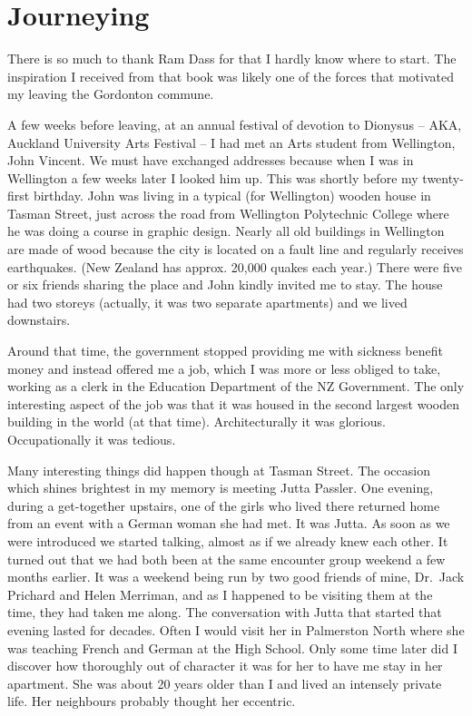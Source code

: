 \chapter{Journeying}

There is so much to thank Ram Dass for that I hardly know where to
start. The inspiration I received from that book was likely one of the
forces that motivated my leaving the Gordonton commune.

A few weeks before leaving, at an annual festival of devotion to
Dionysus -- AKA, Auckland University Arts Festival -- I had met an Arts
student from Wellington, John Vincent. We must have exchanged addresses
because when I was in Wellington a few weeks later I looked him up. This
was shortly before my twenty-first birthday. John was living in a typical (for
Wellington) wooden house in Tasman Street, just across the road from
Wellington Polytechnic College where he was doing a course in graphic
design. Nearly all old buildings in Wellington are made of wood because
the city is located on a fault line and regularly receives earthquakes.
(New Zealand has approx. 20,000 quakes\cite{quakes} each year.)
There were five or six friends sharing the place and John kindly invited
me to stay. The house had two storeys (actually, it was two separate
apartments) and we lived downstairs.

Around that time, the government stopped providing me with sickness
benefit money and instead offered me a job, which I was more or less
obliged to take, working as a clerk in the Education Department of the
NZ Government. The only interesting aspect of the job was that it was
housed in the second largest wooden building\cite{building} in the world (at that time).
Architecturally it was glorious. Occupationally it was tedious.

Many interesting things did happen though at Tasman Street. The occasion
which shines brightest in my memory is meeting Jutta Passler. One
evening, during a get-together upstairs, one of the girls who lived
there returned home from an event with a German woman she had met. It
was Jutta. As soon as we were introduced we started talking, almost as
if we already knew each other. It turned out that we had both been at
the same encounter group weekend a few months earlier. It was a weekend
being run by two good friends of mine, Dr.~Jack Prichard and Helen
Merriman, and as I happened to be visiting them at the time, they had
taken me along. The conversation with Jutta that started that evening
lasted for decades. Often I would visit her in Palmerston North where
she was teaching French and German at the High School. Only some time
later did I discover how thoroughly out of character it was for her to
have me stay in her apartment. She was about 20 years older than I and
lived an intensely private life. Her neighbours probably thought her
eccentric.

